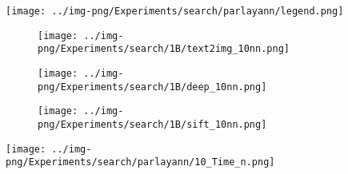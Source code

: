 \begin{figure}[h]
  \centering      
  \begin{minipage}{\columnwidth}
        \texttt{[image: ../img-png/Experiments/search/parlayann/legend.png]}
        \end{minipage}
 \begin{minipage}{0.73\columnwidth}
 \centering
    \begin{minipage}{\textwidth}
        \centering
        \captionsetup{justification=centering}
        \begin{subfigure}{0.32\textwidth}
            \centering
            \captionsetup{justification=centering}
            \texttt{[image: ../img-png/Experiments/search/1B/text2img\_10nn.png]}
            \caption{}
            \label{fig:elpis:query:performance:1B:t2i:10NN}
        \end{subfigure}
        \begin{subfigure}{0.305\textwidth}
            \centering
            \captionsetup{justification=centering}
            \texttt{[image: ../img-png/Experiments/search/1B/deep\_10nn.png]}
            \caption{}
            \label{fig:elpis:query:performance:1B:deep:10NN}
        \end{subfigure}
        \begin{subfigure}{0.305\textwidth}
            \centering
            \captionsetup{justification=centering}
            \texttt{[image: ../img-png/Experiments/search/1B/sift\_10nn.png]}
            \caption{}
            \label{fig:elpis:query:performance:1B:sift:10NN}
        \end{subfigure}
    \end{minipage}
    \caption{}
    \label{fig:elpis:query:performance:1B}
    \end{minipage}
    \begin{minipage}{0.26\columnwidth}
        \centering
        \captionsetup{justification=centering}
        \texttt{[image: ../img-png/Experiments/search/parlayann/10\_Time\_n.png]}
        \caption{}
        \label{fig:optimized_impl}
    \end{minipage}
\end{figure}


